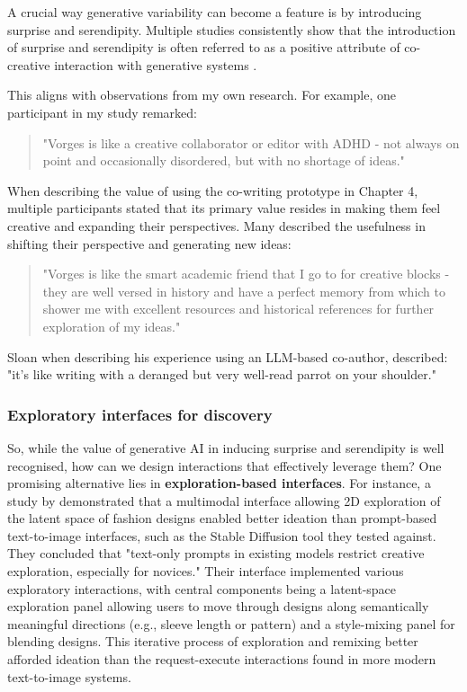 A crucial way generative variability can become a feature is by introducing surprise and serendipity. Multiple studies consistently show that the introduction of surprise and serendipity is often referred to as a positive attribute of co-creative interaction with generative systems \cite{Lawton2023-tb, Chiou2023-vr, Louie2020-aq, Moruzzi2022-gp, Park2024-gw, Koch2020-gx}.

This aligns with observations from my own research. For example, one participant in my study remarked:

\begin{quote}
"Vorges is like a creative collaborator or editor with ADHD - not always on point and occasionally disordered, but with no shortage of ideas."
\end{quote}

When describing the value of using the co-writing prototype in Chapter 4, multiple participants stated that its primary value resides in making them feel creative and expanding their perspectives. Many described the usefulness in shifting their perspective and generating new ideas:

\begin{quote}
"Vorges is like the smart academic friend that I go to for creative blocks - they are well versed in history and have a perfect memory from which to shower me with excellent resources and historical references for further exploration of my ideas."
\end{quote}

Sloan \cite{Sloan2016-fj} when describing his experience using an LLM-based co-author, described: "it's like writing with a deranged but very well-read parrot on your shoulder."

\subsubsection{Exploratory interfaces for discovery}

So, while the value of generative AI in inducing surprise and serendipity is well recognised, how can we design interactions that effectively leverage them? One promising alternative lies in \textbf{exploration-based interfaces}. For instance, a study by \cite{Davis2024-ml} demonstrated that a multimodal interface allowing 2D exploration of the latent space of fashion designs enabled better ideation than prompt-based text-to-image interfaces, such as the Stable Diffusion tool they tested against. They concluded that "text-only prompts in existing models restrict creative exploration, especially for novices." Their interface implemented various exploratory interactions, with central components being a latent-space exploration panel allowing users to move through designs along semantically meaningful directions (e.g., sleeve length or pattern) and a style-mixing panel for blending designs. This iterative process of exploration and remixing better afforded ideation than the request-execute interactions found in more modern text-to-image systems. 

